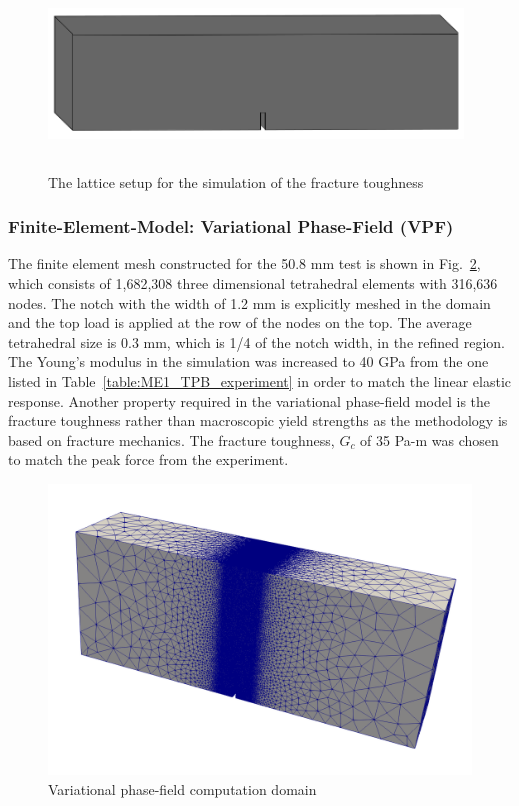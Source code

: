 \begin{figure}[!ht]
\centering
\includegraphics[width=11cm,height=5cm]{figures/Amir_ME1_LEM_Setup.png}
\caption{The lattice setup for the simulation of the fracture toughness}
\label{fig:Amir_ME1_LEM_Setup}
\end{figure}

\subsubsection*{Finite-Element-Model: Variational Phase-Field (VPF)}

The finite element mesh constructed for the 50.8 mm test is shown in Fig.~\ref{fig:ME1_TPB_VF_domain}, which consists of 1,682,308 three dimensional tetrahedral elements with 316,636 nodes.
The notch with the width of 1.2 mm is explicitly meshed in the domain and the top load is applied at the row of the nodes on the top.
The average tetrahedral size is 0.3 mm, which is 1/4 of the notch width, in the refined region.
The Young's modulus in the simulation was increased to 40 GPa from the one listed in Table~\ref{table:ME1_TPB_experiment} in order to match the linear elastic response. 
Another property required in the variational phase-field model is the fracture toughness rather than macroscopic yield strengths as the methodology is based on fracture mechanics.
The fracture toughness, $G_c$ of 35 Pa-m was chosen to match the peak force from the experiment.

\begin{figure}[!ht]
\centering
\includegraphics[width=1\textwidth]{figures/VPF_model_domain_mesh.png}
\caption{Variational phase-field computation domain}
\label{fig:ME1_TPB_VF_domain}
\end{figure}

